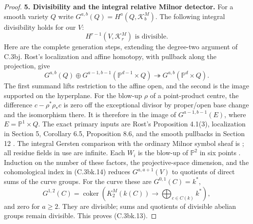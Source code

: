 \begin{proof}
\textbf{5. Divisibility and the integral relative Milnor detector.}
For a smooth variety $Q$ write
$G^{a,b}(Q)=H^a(Q,\mathcal K_b^M)$.
The following integral divisibility holds for our $V$:
\[
 H^{r-1}(V,\mathcal K_r^M)\text{ is divisible}.
 \tag{C.3bk.13}
\]
Here are the complete generation steps, extending the degree-two
argument of C.3bj. Rost's localization and affine homotopy, with
pullback along the projection, give
\[
 G^{a,b}(Q)\oplus
       G^{a-1,b-1}(\mathbb P^{d-1}\times Q)
       \twoheadrightarrow G^{a,b}(\mathbb P^d\times Q).
 \tag{C.3bk.14}
\]
The first summand lifts restriction to the affine open, and the
second is the image supported on the hyperplane. For the blow-up
$\rho$ of a point-product centre, the difference
$c-\rho^*\rho_*c$ is zero off the exceptional divisor by proper/open
base change and the isomorphism there. It is therefore in the image
of $G^{a-1,b-1}(E)$, where $E=\mathbb P^1\times Q$.
The exact primary inputs are Rost's Proposition 4.1(3), localization
in Section 5, Corollary 6.5, Proposition 8.6, and the smooth pullbacks
in Section 12 \citep[pp.~351, 355--360, 370, 382--383]{cyRost1996}.
The integral Gersten comparison with the ordinary Milnor symbol
sheaf is \citet[Theorems 7.1 and 7.5]{cyKerz2009Milnor}; all residue
fields in use are infinite.
Each $W_i$ is the blow-up of $\mathbb P^2$ in six points
\citep[Chapter 4, Proposition 2.4, p.~178]{D_HuybrechtsCubics}.
Induction on the number of these factors, the projective-space
dimension, and the cohomological index in (C.3bk.14) reduces
$G^{a,a+1}(V)$ to quotients of direct sums of the curve groups.
For the curve these are $G^{0,1}(C)=k^*$,
\[
 G^{1,2}(C)=\operatorname{coker}
       \left(K_2^M(k(C))\longrightarrow\bigoplus_{c\in C(k)}k^*\right),
\]
and zero for $a\ge2$.
They are divisible; sums and quotients of divisible abelian groups
remain divisible. This proves (C.3bk.13).


\end{proof}
